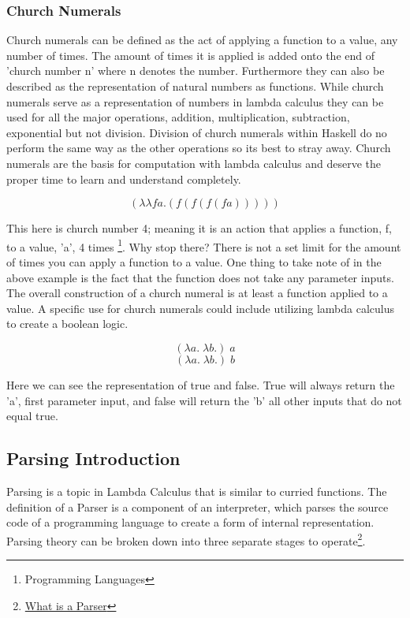 \documentclass{article}
\begin{document}
    
        \subsubsection{Church Numerals}
        Church numerals can be defined as the act of applying a function to a value, any number of times. The amount of times it is applied is added onto the end of 'church number n' where n denotes the number. Furthermore they can also be described as the representation of natural numbers as functions. While church numerals serve as a representation of numbers in lambda calculus they can be used for all the major operations, addition, multiplication, subtraction, exponential but not division. Division of church numerals within Haskell do no perform the same way as the other operations so its best to stray away. Church numerals are the basis for computation with lambda calculus and deserve the proper time to learn and understand completely. 
        
        \medskip
             $$(\lambda λ f a . (f (f (f (f a)))))$$
        \medskip
    
    \noindent This here is church number 4; meaning it is an action that applies a function, f, to a value, 'a', 4 times \footnote{Programming Languages}. Why stop there? There is not a set limit for the amount of times you can apply a function to a value. One thing to take note of in the above example is the fact that the function does not take any parameter inputs. The overall construction of a church numeral is at least a function applied to a value. A specific use for church numerals could include utilizing lambda calculus to create a boolean logic.
    
    $$(\lambda a. \; \lambda b. )\; a$$
    $$(\lambda a. \; \lambda b. )\; b$$
    
    Here we can see the representation of true and false. True will always return the 'a', first parameter input, and false will return the 'b' all other inputs that do not equal true.
        
    \subsection{Parsing Introduction}
    Parsing is a topic in Lambda Calculus that is similar to curried functions. The definition of a Parser is a component of an interpreter, which parses the source code of a programming language to create a form of internal representation. Parsing theory can be broken down into three separate stages to operate\footnote{\href{https://www.techopedia.com/definition/3854/parser}{What is a Parser}}.
    
\end{document}
